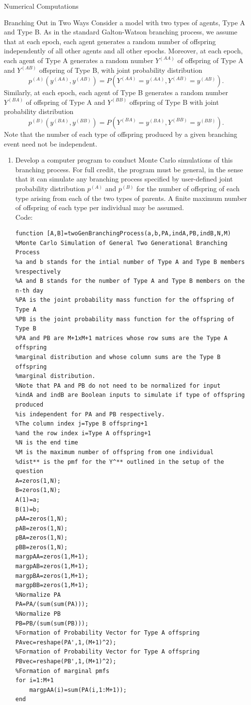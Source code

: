 \documentclass[12pt]{article}
\numberwithin{equation}{section}
\begin{document}
\begin{section}{Numerical Computations}
\begin{subsection}{Branching Out in Two Ways}
Consider a model with two types of agents, Type A and Type B. As in the standard Galton-Watson branching process, we assume that at each epoch, each agent generates a random number of offspring independently of all other agents and all other epochs. Moreover, at each epoch, each agent of Type A generates a random number $Y^{(AA)}$ of offspring of Type A and $Y^{(AB)}$ offspring of Type B, with joint probability distribution
$$p^{(A)}(y^{(AA)},y^{(AB)})=P(Y^{(AA)}=y^{(AA)},Y^{(AB)}=y^{(AB)}).$$
Similarly, at each epoch, each agent of Type B generates a random number $Y^{(BA)}$ of offspring of Type A and $Y^{(BB)}$ offspring of Type B with joint probability distribution
$$p^{(B)}(y^{(BA)},y^{(BB)})=P(Y^{(BA)}=y^{(BA)},Y^{(BB)}=y^{(BB)}).$$
Note that the number of each type of offspring produced by a given branching event need not be independent.
\begin{enumerate}
\item Develop a computer program to conduct Monte Carlo simulations of this branching process. For full credit, the program must be general, in the sense that it can simulate any branching process specified by user-defined joint probability distribution $p^{(A)}$ and $p^{(B)}$ for the number of offspring of each type arising from each of the two types of parents. A finite maximum number of offspring of each type per individual may be assumed.\\

    Code:
    \begin{lstlisting}
function [A,B]=twoGenBranchingProcess(a,b,PA,indA,PB,indB,N,M)
%Monte Carlo Simulation of General Two Generational Branching Process
%a and b stands for the intial number of Type A and Type B members
%respectively
%A and B stands for the number of Type A and Type B members on the n-th day
%PA is the joint probability mass function for the offspring of Type A
%PB is the joint probability mass function for the offspring of Type B
%PA and PB are M+1xM+1 matrices whose row sums are the Type A offspring
%marginal distribution and whose column sums are the Type B offspring
%marginal distribution.
%Note that PA and PB do not need to be normalized for input
%indA and indB are Boolean inputs to simulate if type of offspring produced
%is independent for PA and PB respectively.
%The column index j=Type B offspring+1
%and the row index i=Type A offspring+1
%N is the end time
%M is the maximum number of offspring from one individual
%dist** is the pmf for the Y^** outlined in the setup of the question
A=zeros(1,N);
B=zeros(1,N);
A(1)=a;
B(1)=b;
pAA=zeros(1,N);
pAB=zeros(1,N);
pBA=zeros(1,N);
pBB=zeros(1,N);
margpAA=zeros(1,M+1);
margpAB=zeros(1,M+1);
margpBA=zeros(1,M+1);
margpBB=zeros(1,M+1);
%Normalize PA
PA=PA/(sum(sum(PA)));
%Normalize PB
PB=PB/(sum(sum(PB)));
%Formation of Probability Vector for Type A offspring
PAvec=reshape(PA',1,(M+1)^2);
%Formation of Probability Vector for Type A offspring
PBvec=reshape(PB',1,(M+1)^2);
%Formation of marginal pmfs
for i=1:M+1
    margpAA(i)=sum(PA(i,1:M+1));
end


\end{lstlisting}
\end{enumerate}
\end{subsection}
\end{section}
\end{document}

